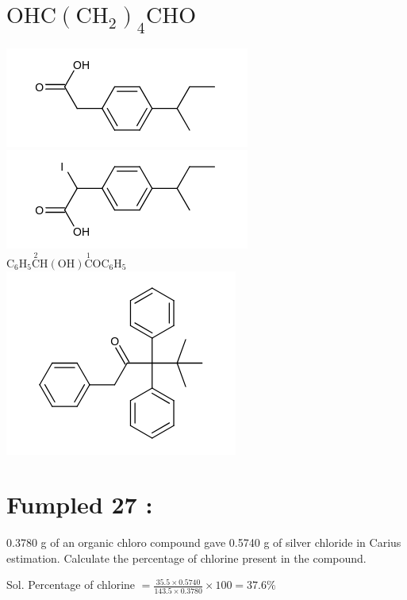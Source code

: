 \documentclass[10pt]{article}
\begin{document}
\section*{$\mathrm{OHC}\left(\mathrm{CH}_{2}\right)_{4} \mathrm{CHO}$}
\includegraphics{smile-323dada9fc5f827b767ac346a0133cb7142401db}\\
\includegraphics{smile-048a4fa2371a0a28a1df3b9c869d4b817d27c0ab}\\
$\mathrm{C}_{6} \mathrm{H}_{5} \stackrel{2}{\mathrm{C}} \mathrm{H}(\mathrm{OH}) \stackrel{1}{\mathrm{C}} \mathrm{OC}_{6} \mathrm{H}_{5}$\\
\includegraphics{smile-b8e7d9477c3d75a1e1ec0bb2b2a58f2c68425c08}

\section*{Fumpled 27 :}
0.3780 g of an organic chloro compound gave 0.5740 g of silver chloride in Carius estimation. Calculate the percentage of chlorine present in the compound.

Sol. Percentage of chlorine $=\frac{35.5 \times 0.5740}{143.5 \times 0.3780} \times 100=37.6 \%$
\end{document}
